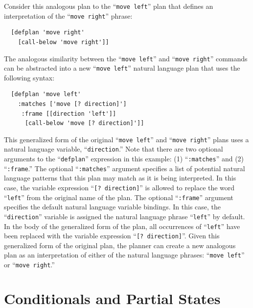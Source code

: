 Consider this analogous plan to the ``{\tt{move left}}'' plan that
defines an interpretation of the ``{\tt{move right}}'' phrase:
\begin{samepage}
\begin{Verbatim}
  [defplan 'move right'
    [call-below 'move right']]
\end{Verbatim}
\end{samepage}
The analogous similarity between the ``{\tt{move left}}'' and
``{\tt{move right}}'' commands can be abstracted into a new
``{\tt{move left}}'' natural language plan that uses the following
syntax:
\begin{samepage}
\begin{Verbatim}
  [defplan 'move left'
    :matches ['move [? direction]']
     :frame [[direction 'left']]
      [call-below 'move [? direction]']]
\end{Verbatim}
\end{samepage}
This generalized form of the original ``{\tt{move left}}'' and
``{\tt{move right}}'' plans uses a natural language variable,
``{\tt{direction}}.''  Note that there are two optional arguments to
the ``{\tt{defplan}}'' expression in this example: (1)
``{\tt{:matches}}'' and (2) ``{\tt{:frame}}.''  The optional
``{\tt{:matches}}'' argument specifies a list of potential natural
language patterns that this plan may match as it is being interpreted.
In this case, the variable expression ``{\tt{[?  direction]}}'' is
allowed to replace the word ``{\tt{left}}'' from the original name of
the plan.  The optional ``{\tt{:frame}}'' argument specifies the
default natural language variable bindings.  In this case, the
``{\tt{direction}}'' variable is assigned the natural language phrase
``{\tt{left}}'' by default.  In the body of the generalized form of
the plan, all occurrences of ``{\tt{left}}'' have been replaced with
the variable expression ``{\tt{[?  direction]}}''.  Given this
generalized form of the original plan, the planner can create a new
analogous plan as an interpretation of either of the natural language
phrases: ``{\tt{move left}}'' or ``{\tt{move right}}.''

\section{Conditionals and Partial States}

